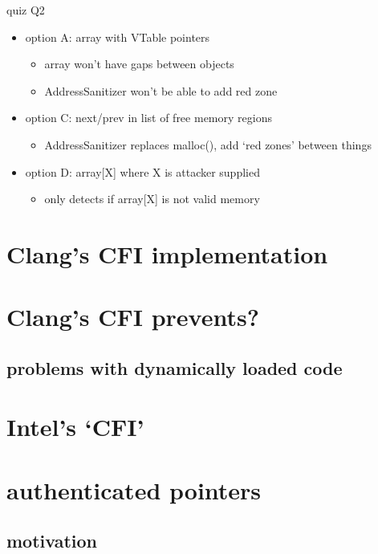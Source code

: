 \begin{frame}{quiz Q2}
    \begin{itemize}
    \item option A: array with VTable pointers
        \begin{itemize}
        \item array won't have gaps between objects
        \item AddressSanitizer won't be able to add red zone
        \end{itemize}
    \item option C: next/prev in list of free memory regions
        \begin{itemize}
        \item AddressSanitizer replaces malloc(), add `red zones' between things
        \end{itemize}
    \item option D: array[X] where X is attacker supplied
        \begin{itemize}
        \item only detects if array[X] is not valid memory
        \end{itemize}
    \end{itemize}
\end{frame}

\section{Clang's CFI implementation}


\section{Clang's CFI prevents?}


\subsection{problems with dynamically loaded code}


\section{Intel's `CFI'}


\section{authenticated pointers}
\subsection{motivation}

